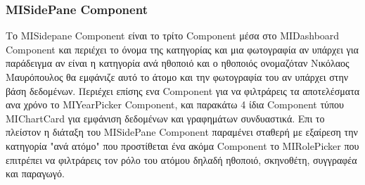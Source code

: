 \subsubsection{MISidePane Component}
Το ΜΙSidepane Component είναι το τρίτο Component μέσα στο MIDashboard Component και περιέχει το όνομα της κατηγορίας και μια φωτογραφία αν υπάρχει
για παράδειγμα αν είναι η κατηγορία ανά ηθοποιό και ο ηθοποιός ονομαζόταν Νικόλαος Μαυρόπουλος θα εμφάνιζε αυτό το άτομο και την φωτογραφία του αν υπάρχει στην βάση δεδομένων. Περιέχει επίσης ενα Component για να φιλτράρεις τα αποτελέσματα ανα χρόνο το MIYearPicker Component, και παρακάτω 4 ίδια Component τύπου MIChartCard για εμφάνιση δεδομένων και γραφημάτων συνδυαστικά. Επι το πλείστον η διάταξη του MISidePane Component παραμένει σταθερή με εξαίρεση την κατηγορία "ανά ατόμο" που προστίθεται ένα ακόμα Component το MIRolePicker που επιτρέπει να φιλτράρεις τον ρόλο του ατόμου δηλαδή ηθοποιό, σκηνοθέτη, συγγραφέα και παραγωγό.






